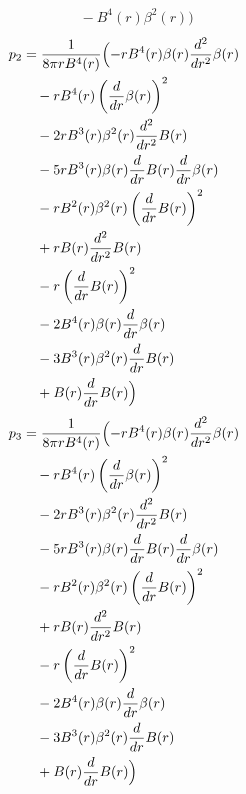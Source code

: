 \documentclass[11pt,a4paper]{article}
\begin{document}
\begin{tcolorbox}[colback=boxblue,colframe=black!40,title=\textbf{Physical stress-energy},breakable]
\begin{align*}
  &\quad - B^{4}{\left(r \right)} \beta^{2}{\left(r \right)}\Bigr)
\end{align*}
\begin{align*}
  p_2 &= \frac{1}{8 \pi r B^{4}{\left(r \right)}}\Bigl(- r B^{4}{\left(r \right)} \beta{\left(r \right)} \frac{d^{2}}{d r^{2}} \beta{\left(r \right)} \\
  &\quad - r B^{4}{\left(r \right)} \left(\frac{d}{d r} \beta{\left(r \right)}\right)^{2} \\
  &\quad - 2 r B^{3}{\left(r \right)} \beta^{2}{\left(r \right)} \frac{d^{2}}{d r^{2}} B{\left(r \right)} \\
  &\quad - 5 r B^{3}{\left(r \right)} \beta{\left(r \right)} \frac{d}{d r} B{\left(r \right)} \frac{d}{d r} \beta{\left(r \right)} \\
  &\quad - r B^{2}{\left(r \right)} \beta^{2}{\left(r \right)} \left(\frac{d}{d r} B{\left(r \right)}\right)^{2} \\
  &\quad + r B{\left(r \right)} \frac{d^{2}}{d r^{2}} B{\left(r \right)} \\
  &\quad - r \left(\frac{d}{d r} B{\left(r \right)}\right)^{2} \\
  &\quad - 2 B^{4}{\left(r \right)} \beta{\left(r \right)} \frac{d}{d r} \beta{\left(r \right)} \\
  &\quad - 3 B^{3}{\left(r \right)} \beta^{2}{\left(r \right)} \frac{d}{d r} B{\left(r \right)} \\
  &\quad + B{\left(r \right)} \frac{d}{d r} B{\left(r \right)}\Bigr)
\end{align*}
\begin{align*}
  p_3 &= \frac{1}{8 \pi r B^{4}{\left(r \right)}}\Bigl(- r B^{4}{\left(r \right)} \beta{\left(r \right)} \frac{d^{2}}{d r^{2}} \beta{\left(r \right)} \\
  &\quad - r B^{4}{\left(r \right)} \left(\frac{d}{d r} \beta{\left(r \right)}\right)^{2} \\
  &\quad - 2 r B^{3}{\left(r \right)} \beta^{2}{\left(r \right)} \frac{d^{2}}{d r^{2}} B{\left(r \right)} \\
  &\quad - 5 r B^{3}{\left(r \right)} \beta{\left(r \right)} \frac{d}{d r} B{\left(r \right)} \frac{d}{d r} \beta{\left(r \right)} \\
  &\quad - r B^{2}{\left(r \right)} \beta^{2}{\left(r \right)} \left(\frac{d}{d r} B{\left(r \right)}\right)^{2} \\
  &\quad + r B{\left(r \right)} \frac{d^{2}}{d r^{2}} B{\left(r \right)} \\
  &\quad - r \left(\frac{d}{d r} B{\left(r \right)}\right)^{2} \\
  &\quad - 2 B^{4}{\left(r \right)} \beta{\left(r \right)} \frac{d}{d r} \beta{\left(r \right)} \\
  &\quad - 3 B^{3}{\left(r \right)} \beta^{2}{\left(r \right)} \frac{d}{d r} B{\left(r \right)} \\
  &\quad + B{\left(r \right)} \frac{d}{d r} B{\left(r \right)}\Bigr)
\end{align*}
\end{tcolorbox}
\end{document}
